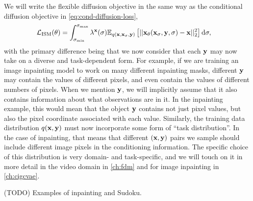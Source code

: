 We will write the flexible diffusion objective in the same way as the conditional diffusion objective in \cref{eq:cond-diffusion-loss},
\begin{align} \label{eq:flexible-diffusion-loss}
    \mathcal{L}_\text{ISM}(\theta) &= \int_{\sigma_\text{min}}^{\sigma_\text{max}} \lambda^{\mathbf{x}}(\sigma) \mathbb{E}_{q({\mathbf{x}}, {\mathbf{x}}_\sigma,{\mathbf{y}})} \left[ 
    || {\mathbf{x}}_\theta({\mathbf{x}}_\sigma, {\mathbf{y}}, \sigma) - {\mathbf{x}} ||_2^2 \right] \mathrm{d}\sigma,
\end{align}
with the primary difference being that we now consider that each ${\mathbf{y}}$ may now take on a diverse and task-dependent form. For example, if we are training an image inpainting model to work on many different inpainting masks, different ${\mathbf{y}}$ may contain the values of different pixels, and even contain the values of different numbers of pixels. When we mention ${\mathbf{y}}$, we will implicitly assume that it also contains information about what observations are in it. In the inpainting example, this would mean that the object ${\mathbf{y}}$ contains not just pixel values, but also the pixel coordinate associated with each value. Similarly, the training data distribution $q({\mathbf{x}}, {\mathbf{y}})$ must now incorporate some form of ``task distribution''. In the case of inpainting, that means that different $({\mathbf{x}}, {\mathbf{y}})$ pairs we sample should include different image pixels in the conditioning information. The specific choice of this distribution is very domain- and task-specific, and we will touch on it in more detail in the video domain in \cref{ch:fdm} and for image inpainting in \cref{ch:cigcvae}.

(TODO) Examples of inpainting and Sudoku.
